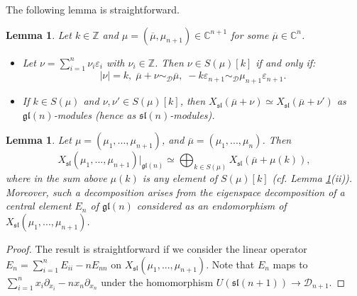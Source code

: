 \documentclass[12pt]{amsart}
\def\gl{\mathfrak{l}}
\def\gs{\mathfrak{s}}
\newtheorem{lem}[thm]{Lemma}
\begin{document}
The following lemma is straightforward. 

\begin{lem} \label{lem-set-s}Let $k \in {\mathbb Z}$  and $\mu  = (\overline{\mu}, \mu_{n+1}) \in {\mathbb C}^{n+1}$ for some $\overline{\mu} \in {\mathbb C}^{n}$.
\begin{itemize}

\item[(i)] Let $\nu =  \sum_{i=1}^n \nu_i \varepsilon_i$ with $\nu_i \in {\mathbb Z}$. Then $\nu \in S(\mu)[k]$ if and only if:
$$|\nu|= k, \; \overline{\mu} + \nu \sim_{\mathcal D} \overline{\mu}, \; -k \varepsilon_{n+1} \sim_{\mathcal D}  \mu_{n+1} \varepsilon_{n+1}.$$
\item[(ii)]  If $k \in S(\mu)$ and  $\nu, \nu' \in S(\mu)[k]$, then $X_{\mathfrak{sl}}(\overline{\mu} + \nu) \simeq X_{\mathfrak{sl}}(\overline{\mu} + \nu')$ as $\mathfrak{gl}({n})$-modules (hence as $\gs \gl (n)$-modules).
\end{itemize}
\end{lem}

\begin{lem}\label{lem-decomp} Let  $\mu = (\mu_1,...,\mu_{n+1})$, and $\overline{\mu} = (\mu_1,...,\mu_{n})$. Then 
$$
X_{\mathfrak{sl}}(\mu_1,...,\mu_{n+1})|_{\mathfrak{gl} (n)} \simeq \bigoplus_{k \in {S(\mu)}} X_{\mathfrak{sl}}(\overline{\mu} + \mu(k)),
$$
where in the sum above $\mu(k)$ is any element of $S(\mu)[k]$ (cf. Lemma \ref{lem-set-s}(ii)). Moreover, such a  decomposition arises from the eigenspace decomposition of a central element $E_{n}$ of $\mathfrak{gl}({n})$ considered as an endomorphism of $X_{\mathfrak{sl}}(\mu_1,...,\mu_{n+1})$.
\end{lem}
\begin{proof}
The result is straightforward if we  consider the linear operator  $E_n = \sum_{i=1}^nE_{ii} - n E_{nn}$ on $X_{\mathfrak{sl}}(\mu_1,...,\mu_{n+1})$.
Note that   $E_n$ maps to $\sum_{i=1}^n {x_i \partial_{x_i}} - nx_n \partial_{x_n} $ under the homomorphism $U(\mathfrak{sl}({n+1})) \to {\mathcal D}_{n+1}$.
\end{proof}
\end{document}

